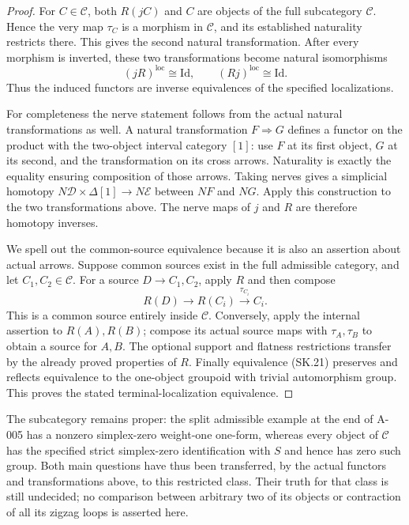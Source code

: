 \begin{proof}
For $C\in\mathcal C$, both $R(jC)$ and $C$ are objects of the
full subcategory $\mathcal C$. Hence the very map $\tau_C$
is a morphism in $\mathcal C$, and its established naturality
restricts there. This gives the second natural transformation.
After every morphism is inverted, these two transformations
become natural isomorphisms
\[
       (jR)^{\mathrm{loc}}\cong\mathrm{Id},\qquad
       (Rj)^{\mathrm{loc}}\cong\mathrm{Id}.
 \tag{SK.21}
\]
Thus the induced functors are inverse equivalences of the
specified localizations.

For completeness the nerve statement follows from the actual
natural transformations as well. A natural transformation
$F\Rightarrow G$ defines a functor on the product with the
two-object interval category $[1]$: use $F$ at its first object,
$G$ at its second, and the transformation on its cross arrows.
Naturality is exactly the equality ensuring composition of those
arrows. Taking nerves gives a simplicial homotopy
$N\mathcal D\times\Delta[1]\to N\mathcal E$ between $NF$ and
$NG$. Apply this construction to the two transformations above.
The nerve maps of $j$ and $R$ are therefore homotopy inverses.

We spell out the common-source equivalence because it is also
an assertion about actual arrows. Suppose common sources exist
in the full admissible category, and let $C_1,C_2\in\mathcal C$.
For a source $D\to C_1,C_2$, apply $R$ and then compose
\[
                     R(D)\longrightarrow R(C_i)
                              \xrightarrow{\tau_{C_i}} C_i.
 \tag{SK.22}
\]
This is a common source entirely inside $\mathcal C$.
Conversely, apply the internal assertion to $R(A),R(B)$;
compose its actual source maps with $\tau_A,\tau_B$ to obtain
a source for $A,B$. The optional support and flatness restrictions
transfer by the already proved properties of $R$.
Finally equivalence (SK.21) preserves and reflects equivalence
to the one-object groupoid with trivial automorphism group.
This proves the stated terminal-localization equivalence.
\end{proof}

The subcategory remains proper: the split admissible example
at the end of A-005 has a nonzero simplex-zero weight-one one-form,
whereas every object of $\mathcal C$ has the specified strict
simplex-zero identification with $S$ and hence has zero such group.
Both main questions have thus been transferred, by the actual
functors and transformations above, to this restricted class.
Their truth for that class is still undecided; no comparison
between arbitrary two of its objects or contraction of all its
zigzag loops is asserted here.
